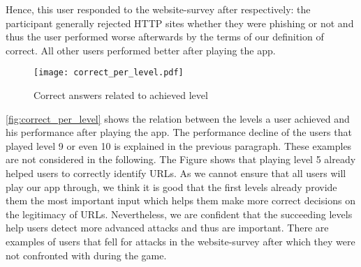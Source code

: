 \begin{description}[leftmargin=0cm]
	Hence, this user responded to the website-survey after respectively: the participant generally rejected HTTP sites whether they were phishing or not and thus the user performed worse afterwards by the terms of our definition of correct.
	All other users performed better after playing the app.
	\item[Relation Between Achieved Level and Identified Websites] 
		\begin{figure}
			\centering
			\texttt{[image: correct\_per\_level.pdf]}
			\caption{Correct answers related to achieved level}
			\label{fig:correct_per_level}
			\end{figure}
	\autoref{fig:correct_per_level} shows the relation between the levels a user achieved and his performance after playing the app. The performance decline of the users that played level 9 or even 10 is explained in the previous paragraph. These examples are not considered in the following. The Figure shows that playing level 5 already helped users to correctly identify URLs.
As we cannot ensure that all users will play our app through, we think it is good that the first levels already provide them the most important input which helps them make more correct decisions on the legitimacy of URLs. 
Nevertheless, we are confident that the succeeding levels help users detect more advanced attacks and thus are important. There are examples of users that fell for attacks in the website-survey after which they were not confronted with during the game.


\end{description}
